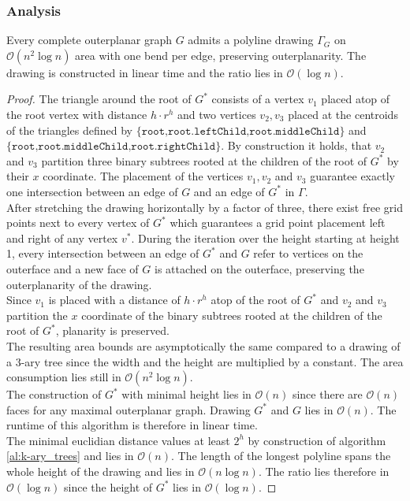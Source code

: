 \subsubsection{Analysis}

\begin{theorem}
	Every complete outerplanar graph $G$ admits a polyline drawing $\Gamma_G$ on $\mathcal{O}(n^2 \log n)$ area with one bend per edge, preserving outerplanarity. The drawing is constructed in linear time and the ratio lies in $\mathcal{O}(\log n)$.
\end{theorem}

\begin{proof}
	The triangle around the root of $G^*$ consists of a vertex $v_1$ placed atop of the root vertex with distance $h\cdot r^h$ and two vertices $v_2,v_3$ placed at the centroids of the triangles defined by $\{\texttt{root,root.leftChild,root.middleChild}\}$ and $\{\texttt{root,root.middleChild,root.rightChild}\}$. By construction it holds, that $v_2$ and $v_3$ partition three binary subtrees rooted at the children of the root of $G^*$ by their $x$ coordinate. The placement of the vertices $v_1,v_2$ and $v_3$ guarantee exactly one intersection between an edge of $G$ and an edge of $G^*$ in $\Gamma$.\\
	After stretching the drawing horizontally by a factor of three, there exist free grid points next to every vertex of $G^*$ which guarantees a grid point placement left and right of any vertex $v^*$. During the iteration over the height starting at height 1, every intersection between an edge of $G^*$ and $G$ refer to vertices on the outerface and a new face of $G$ is attached on the outerface, preserving the outerplanarity of the drawing.\\
	Since $v_1$ is placed with a distance of $h\cdot r^h$ atop of the root of $G^*$ and $v_2$ and $v_3$ partition the $x$ coordinate of the binary subtrees rooted at the children of the root of $G^*$, planarity is preserved.\\
	The resulting area bounds are asymptotically the same compared to a drawing of a $3$-ary tree since the width and the height are multiplied by a constant. The area consumption lies still in $\mathcal{O}(n^2 \log n)$.\\
	The construction of $G^*$ with minimal height lies in $\mathcal{O}(n)$ since there are $\mathcal{O}(n)$ faces for any maximal outerplanar graph. Drawing $G^*$ and $G$ lies in $\mathcal{O}(n)$. The runtime of this algorithm is therefore in linear time.\\
	The minimal euclidian distance values at least $2^h$ by construction of algorithm \ref{al:k-ary_trees} and lies in $\mathcal{O}(n)$. The length of the longest polyline spans the whole height of the drawing and lies in $\mathcal{O}(n \log n)$. The ratio lies therefore in $\mathcal{O}(\log n)$ since the height of $G^*$ lies in $\mathcal{O}(\log n)$.
\end{proof}
